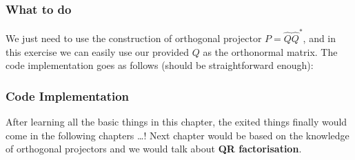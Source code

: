 \subsubsection*{What to do}%
We just need to use the construction of orthogonal projector $P = \hat{Q}\hat{Q}^*$, and in this exercise we can easily use our provided $Q$ as the orthonormal matrix. The code implementation goes as follows (should be straightforward enough):

\subsubsection*{Code Implementation}%


\noindent After learning all the basic things in this chapter, the exited things finally would come in the following chapters \ldots! Next chapter would be based on the knowledge of orthogonal projectors and we would talk about \textbf{QR factorisation}. 





